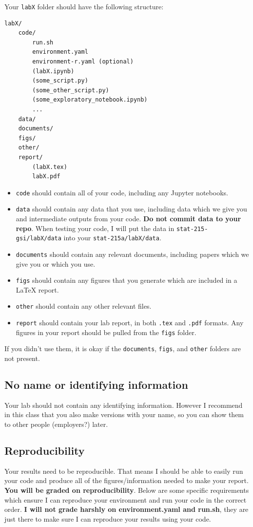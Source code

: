 \documentclass[letterpaper,12pt]{article}
\begin{document}
Your \texttt{labX} folder should have the following structure:
\begin{verbatim}
labX/
    code/
        run.sh
        environment.yaml
        environment-r.yaml (optional)
        (labX.ipynb)
        (some_script.py)
        (some_other_script.py)
        (some_exploratory_notebook.ipynb)
        ...
    data/
    documents/
    figs/
    other/
    report/
        (labX.tex)
        labX.pdf
\end{verbatim}
\begin{itemize}
    \item \texttt{code} should contain all of your code, including any Jupyter notebooks.
    \item  \texttt{data} should contain any data that you use, including data which we give you and intermediate outputs from your code. \textbf{Do not commit data to your repo}. When testing your code, I will put the data in \texttt{stat-215-gsi/labX/data} into your \texttt{stat-215a/labX/data}.
    \item \texttt{documents} should contain any relevant documents, including papers which we give you or which you use.
    \item \texttt{figs} should contain any figures that you generate which are included in a LaTeX report.
    \item \texttt{other} should contain any other relevant files.
    \item \texttt{report} should contain your lab report, in both \texttt{.tex} and \texttt{.pdf} formats. Any figures in your report should be pulled from the \texttt{figs} folder.
\end{itemize}
If you didn't use them, it is okay if the \texttt{documents}, \texttt{figs}, and \texttt{other} folders are not present.

\subsection{No name or identifying information}
Your lab should not contain any identifying information. However I recommend in this class that you also make versions with your name, so you can show them to other people (employers?) later.

\subsection{Reproducibility}
Your results need to be reproducible. That means I should be able to easily run your code and produce all of the figures/information needed to make your report. \textbf{You will be graded on reproducibility}. Below are some specific requirements which ensure I can reproduce your environment and run your code in the correct order. \textbf{I will not grade harshly on environment.yaml and run.sh}, they are just there to make sure I can reproduce your results using your code.
\end{document}
